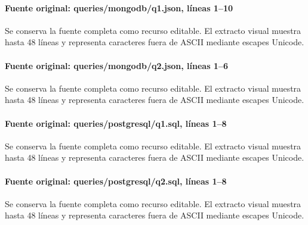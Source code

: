 \paragraph{Fuente original: queries/\allowbreak{}mongodb/\allowbreak{}q1.\allowbreak{}json, líneas 1--10}
Se conserva la fuente completa como recurso editable. El extracto visual muestra hasta 48 líneas y representa caracteres fuera de ASCII mediante escapes Unicode.

\paragraph{Fuente original: queries/\allowbreak{}mongodb/\allowbreak{}q2.\allowbreak{}json, líneas 1--6}
Se conserva la fuente completa como recurso editable. El extracto visual muestra hasta 48 líneas y representa caracteres fuera de ASCII mediante escapes Unicode.

\paragraph{Fuente original: queries/\allowbreak{}postgresql/\allowbreak{}q1.\allowbreak{}sql, líneas 1--8}
Se conserva la fuente completa como recurso editable. El extracto visual muestra hasta 48 líneas y representa caracteres fuera de ASCII mediante escapes Unicode.

\paragraph{Fuente original: queries/\allowbreak{}postgresql/\allowbreak{}q2.\allowbreak{}sql, líneas 1--8}
Se conserva la fuente completa como recurso editable. El extracto visual muestra hasta 48 líneas y representa caracteres fuera de ASCII mediante escapes Unicode.
